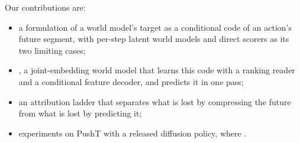 Our contributions are:
\begin{itemize}[leftmargin=*,topsep=2pt,itemsep=1pt]
\item a formulation of a world model's target as a conditional code of an action's future segment, with per-step latent world models and direct scorers as its two limiting cases;
\item \method, a joint-embedding world model that learns this code with a ranking reader and a conditional feature decoder, and predicts it in one pass;
\item an attribution ladder that separates what is lost by compressing the future from what is lost by predicting it;
\item experiments on PushT with a released diffusion policy, where \method {}. 
\end{itemize}


